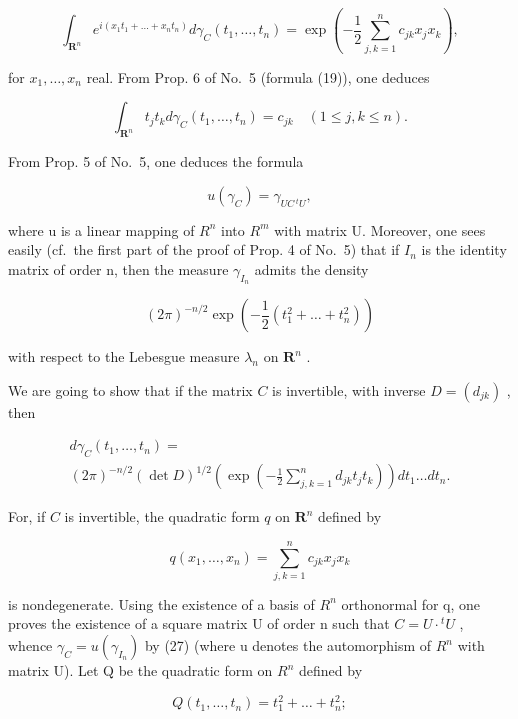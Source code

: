 \[
\int_ {\mathbf {R} ^ {n}} e ^ {i (x _ {1} t _ {1} + \dots + x _ {n} t _ {n})} d \gamma_ {C} (t _ {1}, \dots , t _ {n}) = \exp \left(- \frac {1}{2} \sum_ {j, k = 1} ^ {n} c _ {j k} x _ {j} x _ {k}\right),\tag{25}
\]

for \(x_{1}, \ldots, x_{n}\) real. From Prop. 6 of No.~5 (formula (19)), one deduces

\[
\int_ {\mathbf {R} ^ {n}} t _ {j} t _ {k} d \gamma_ {C} (t _ {1}, \dots , t _ {n}) = c _ {j k} \quad (1 \leqslant j, k \leqslant n).\tag{26}
\]

From Prop. 5 of No.~5, one deduces the formula

\[
u (\gamma_ {C}) = \gamma_{U C\,{}^{t}U}  ,\tag{27}
\]

where u is a linear mapping of \(R^{n}\) into \(R^{m}\) with matrix U. Moreover, one sees easily (cf.~the first part of the proof of Prop. 4 of No.~5) that if \(I_{n}\) is the identity matrix of order n, then the measure \(\gamma_{I_{n}}\) admits the density

\[
(2 \pi) ^ {- n / 2} \exp \left(- \frac {1}{2} (t _ {1} ^ {2} + \dots + t _ {n} ^ {2})\right)
\]

with respect to the Lebesgue measure \(\lambda_{n}\) on \(\mathbf{R}^{n}\) .

We are going to show that if the matrix \(C\) is invertible, with inverse \(D = (d_{jk})\) , then

\[
\begin{array}{l} d \gamma_ {C} (t _ {1}, \dots , t _ {n}) = \\ (2 \pi) ^ {- n / 2} (\det D) ^ {1 / 2} \left(\exp \left(- \frac {1}{2} \sum_ {j, k = 1} ^ {n} d _ {j k} t _ {j} t _ {k}\right)\right) d t _ {1} \dots d t _ {n}. \end{array}\tag{28}
\]

For, if \(C\) is invertible, the quadratic form \(q\) on \(\mathbf{R}^n\) defined by

\[
q (x _ {1}, \dots , x _ {n}) = \sum_ {j, k = 1} ^ {n} c _ {j k} x _ {j} x _ {k}
\]

is nondegenerate. Using the existence of a basis of \(R^{n}\) orthonormal for q, one proves the existence of a square matrix U of order n such that \(C = U \cdot {}^{t}U\) , whence \(\gamma_{C} = u(\gamma_{I_{n}})\) by (27) (where u denotes the automorphism of \(R^{n}\) with matrix U). Let Q be the quadratic form on \(R^{n}\) defined by

\[
Q (t _ {1}, \dots , t _ {n}) = t _ {1} ^ {2} + \dots + t _ {n} ^ {2};
\]

